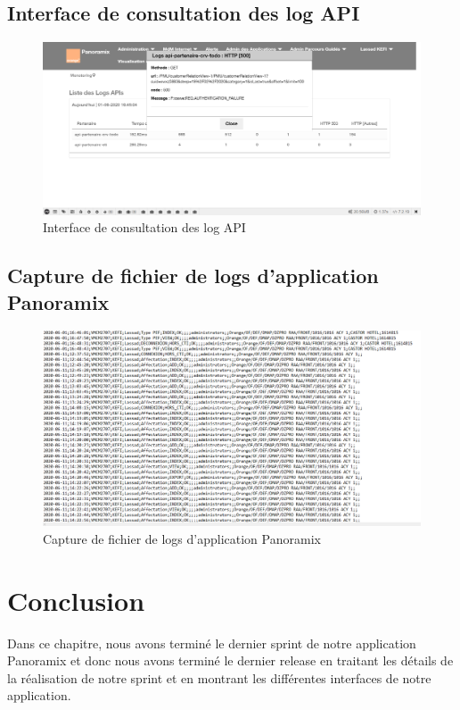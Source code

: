 \subsection{Interface de consultation des log API}
\begin{figure}[H]
	\centering
	\includegraphics[width=0.7\linewidth]{"img/screenshots/logs + srcd/detailed log"}
	\caption[Interface de consultation des log API]{Interface de consultation des log API}
	\label{fig:detailed-log}
\end{figure}

\subsection{Capture de fichier de logs d’application Panoramix}

\begin{figure}[H]
	\centering
	\includegraphics[width=0.7\linewidth]{"img/screenshots/logs + srcd/log-application"}
	\caption[Capture de fichier de logs d’application Panoramix]{Capture de fichier de logs d’application Panoramix}
	\label{fig:log-application}
\end{figure}

\section*{Conclusion}
Dans ce chapitre, nous avons terminé le dernier sprint de notre application Panoramix et donc nous avons terminé le dernier release en traitant les détails de la réalisation de notre sprint et en montrant les différentes interfaces de notre application.






